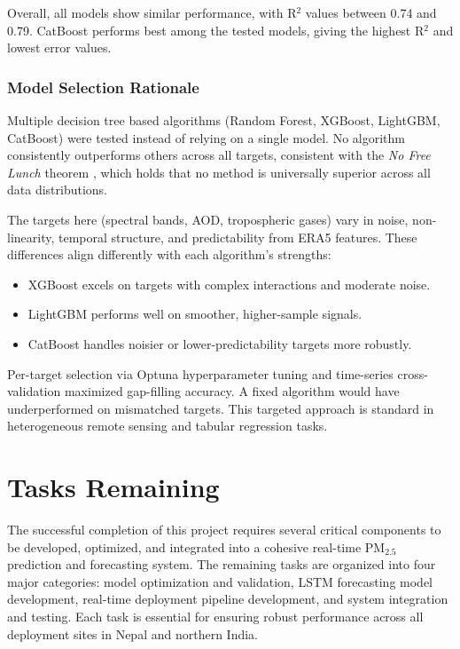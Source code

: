 \documentclass[12pt]{report}
\begin{document}
Overall, all models show similar performance, with R$^2$ values between 0.74 and 0.79. CatBoost performs best among the tested models, giving the highest R$^2$ and lowest error values. 

\subsection*{Model Selection Rationale}

Multiple decision tree based algorithms (Random Forest, XGBoost, LightGBM, CatBoost) were tested instead of relying on a single model. No algorithm consistently outperforms others across all targets, consistent with the \textit{No Free Lunch} theorem \citep{wolpert1996lack}, which holds that no method is universally superior across all data distributions.

The targets here (spectral bands, AOD, tropospheric gases) vary in noise, non-linearity, temporal structure, and predictability from ERA5 features. These differences align differently with each algorithm's strengths:

\begin{itemize}
    \item XGBoost excels on targets with complex interactions and moderate noise.
    \item LightGBM performs well on smoother, higher-sample signals.
    \item CatBoost handles noisier or lower-predictability targets more robustly.
\end{itemize}

Per-target selection via Optuna hyperparameter tuning and time-series cross-validation maximized gap-filling accuracy. A fixed algorithm would have underperformed on mismatched targets. This targeted approach is standard in heterogeneous remote sensing and tabular regression tasks.

\chapter{Tasks Remaining}

The successful completion of this project requires several critical components to be developed, optimized, and integrated into a cohesive real-time PM$_{2.5}$ prediction and forecasting system. The remaining tasks are organized into four major categories: model optimization and validation, LSTM forecasting model development, real-time deployment pipeline development, and system integration and testing. Each task is essential for ensuring robust performance across all deployment sites in Nepal and northern India.
\end{document}
